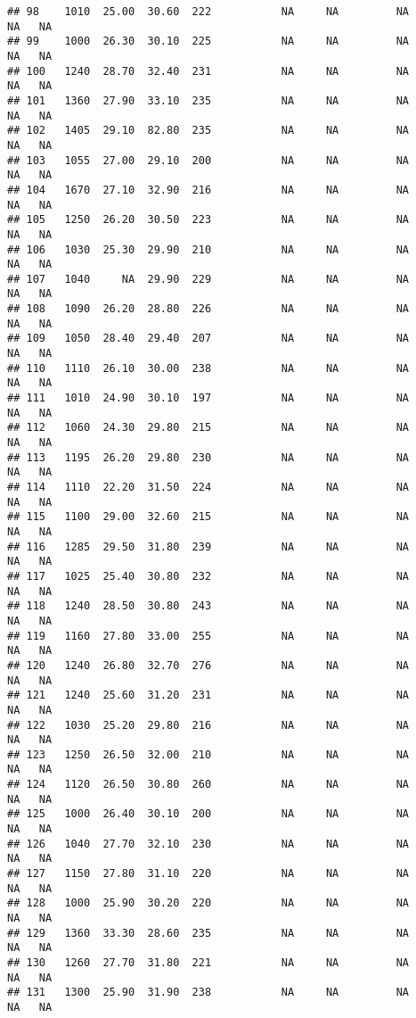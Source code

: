 \documentclass[
]{article}
\begin{document}
\begin{verbatim}
## 98    1010  25.00  30.60  222           NA     NA         NA      NA   NA
## 99    1000  26.30  30.10  225           NA     NA         NA      NA   NA
## 100   1240  28.70  32.40  231           NA     NA         NA      NA   NA
## 101   1360  27.90  33.10  235           NA     NA         NA      NA   NA
## 102   1405  29.10  82.80  235           NA     NA         NA      NA   NA
## 103   1055  27.00  29.10  200           NA     NA         NA      NA   NA
## 104   1670  27.10  32.90  216           NA     NA         NA      NA   NA
## 105   1250  26.20  30.50  223           NA     NA         NA      NA   NA
## 106   1030  25.30  29.90  210           NA     NA         NA      NA   NA
## 107   1040     NA  29.90  229           NA     NA         NA      NA   NA
## 108   1090  26.20  28.80  226           NA     NA         NA      NA   NA
## 109   1050  28.40  29.40  207           NA     NA         NA      NA   NA
## 110   1110  26.10  30.00  238           NA     NA         NA      NA   NA
## 111   1010  24.90  30.10  197           NA     NA         NA      NA   NA
## 112   1060  24.30  29.80  215           NA     NA         NA      NA   NA
## 113   1195  26.20  29.80  230           NA     NA         NA      NA   NA
## 114   1110  22.20  31.50  224           NA     NA         NA      NA   NA
## 115   1100  29.00  32.60  215           NA     NA         NA      NA   NA
## 116   1285  29.50  31.80  239           NA     NA         NA      NA   NA
## 117   1025  25.40  30.80  232           NA     NA         NA      NA   NA
## 118   1240  28.50  30.80  243           NA     NA         NA      NA   NA
## 119   1160  27.80  33.00  255           NA     NA         NA      NA   NA
## 120   1240  26.80  32.70  276           NA     NA         NA      NA   NA
## 121   1240  25.60  31.20  231           NA     NA         NA      NA   NA
## 122   1030  25.20  29.80  216           NA     NA         NA      NA   NA
## 123   1250  26.50  32.00  210           NA     NA         NA      NA   NA
## 124   1120  26.50  30.80  260           NA     NA         NA      NA   NA
## 125   1000  26.40  30.10  200           NA     NA         NA      NA   NA
## 126   1040  27.70  32.10  230           NA     NA         NA      NA   NA
## 127   1150  27.80  31.10  220           NA     NA         NA      NA   NA
## 128   1000  25.90  30.20  220           NA     NA         NA      NA   NA
## 129   1360  33.30  28.60  235           NA     NA         NA      NA   NA
## 130   1260  27.70  31.80  221           NA     NA         NA      NA   NA
## 131   1300  25.90  31.90  238           NA     NA         NA      NA   NA

\end{verbatim}
\end{document}
